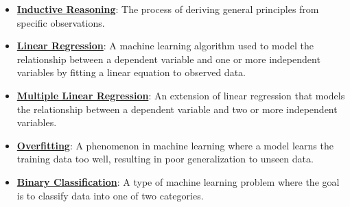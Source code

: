 \documentclass{article}%
\begin{document}
\begin{itemize}[leftmargin=*]%
\item \href{https://purdue.brightspace.com/d2l/common/assets/pdfjs-d2l-dist/1.0.14-legacy/web/viewer.html?file=\%2Fcontent\%2Fenforced\%2F1095467-wl.202510.CS.24300.001\%2F05L2-ML Basics.pdf\%3Fou\%3D1095467\&lang=en-us\&container=d2l-fileviewer-rendered-pdf\&fullscreen=d2l-fileviewer-rendered-pdf-dialog\&height=667#page=3}{\textbf{Inductive Reasoning}}: The process of deriving general principles from specific observations.%
\item \href{https://purdue.brightspace.com/d2l/common/assets/pdfjs-d2l-dist/1.0.14-legacy/web/viewer.html?file=\%2Fcontent\%2Fenforced\%2F1095467-wl.202510.CS.24300.001\%2F05L2-ML Basics.pdf\%3Fou\%3D1095467\&lang=en-us\&container=d2l-fileviewer-rendered-pdf\&fullscreen=d2l-fileviewer-rendered-pdf-dialog\&height=667#page=6}{\textbf{Linear Regression}}: A machine learning algorithm used to model the relationship between a dependent variable and one or more independent variables by fitting a linear equation to observed data.%
\item \href{https://purdue.brightspace.com/d2l/common/assets/pdfjs-d2l-dist/1.0.14-legacy/web/viewer.html?file=\%2Fcontent\%2Fenforced\%2F1095467-wl.202510.CS.24300.001\%2F05L2-ML Basics.pdf\%3Fou\%3D1095467\&lang=en-us\&container=d2l-fileviewer-rendered-pdf\&fullscreen=d2l-fileviewer-rendered-pdf-dialog\&height=667#page=11}{\textbf{Multiple Linear Regression}}: An extension of linear regression that models the relationship between a dependent variable and two or more independent variables.%
\item \href{https://purdue.brightspace.com/d2l/common/assets/pdfjs-d2l-dist/1.0.14-legacy/web/viewer.html?file=\%2Fcontent\%2Fenforced\%2F1095467-wl.202510.CS.24300.001\%2F05L2-ML Basics.pdf\%3Fou\%3D1095467\&lang=en-us\&container=d2l-fileviewer-rendered-pdf\&fullscreen=d2l-fileviewer-rendered-pdf-dialog\&height=667#page=14}{\textbf{Overfitting}}: A phenomenon in machine learning where a model learns the training data too well, resulting in poor generalization to unseen data.%
\item \href{https://purdue.brightspace.com/d2l/common/assets/pdfjs-d2l-dist/1.0.14-legacy/web/viewer.html?file=\%2Fcontent\%2Fenforced\%2F1095467-wl.202510.CS.24300.001\%2F05L2-ML Basics.pdf\%3Fou\%3D1095467\&lang=en-us\&container=d2l-fileviewer-rendered-pdf\&fullscreen=d2l-fileviewer-rendered-pdf-dialog\&height=667#page=20}{\textbf{Binary Classification}}: A type of machine learning problem where the goal is to classify data into one of two categories.%

\end{itemize}
\end{document}
